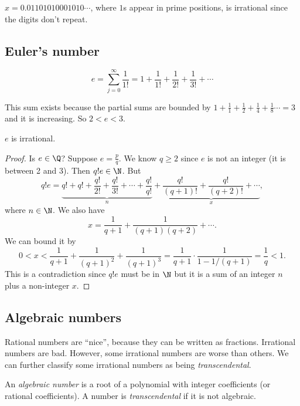 \documentclass[a4paper]{article}
\begin{document}
\begin{eg}
  $x = 0.01101010001010\cdots$, where $1$s appear in prime positions, is irrational since the digits don't repeat.
\end{eg}
\subsection{Euler's number}
\begin{defi}
  \[
    e = \sum_{j=0}^\infty \frac{1}{1!} = 1 + \frac{1}{1!} + \frac{1}{2!} + \frac{1}{3!} + \cdots
  \]
\end{defi}
This sum exists because the partial sums are bounded by $1 + \frac{1}{1} + \frac{1}{2} + \frac{1}{4} + \frac{1}{8}\cdots = 3$ and it is increasing. So $2 < e < 3$.

\begin{prop}
  $e$ is irrational.
\end{prop}

\begin{proof}
  Is $e\in \Q$? Suppose $e = \frac{p}{q}$. We know $q\geq 2$ since $e$ is not an integer (it is between 2 and 3). Then $q!e \in \N$. But
  \[
    q!e = \underbrace{q! + q! + \frac{q!}{2!} + \frac{q!}{3!} + \cdots + \frac{q!}{q!}}_{n} + \underbrace{\frac{q!}{(q + 1)!} + \frac{q!}{(q + 2)!} + \cdots}_{x},
  \]
  where $n \in \N$. We also have
  \[
    x = \frac{1}{q + 1} + \frac{1}{(q + 1)(q + 2)} + \cdots.
  \]
  We can bound it by
  \[
    0 < x < \frac{1}{q+1} +\frac{1}{(q + 1)^2} + \frac{1}{(q + 1)^3} = \frac{1}{q + 1}\cdot \frac{1}{1 - 1/(q + 1)} = \frac{1}{q} < 1.
  \]
  This is a contradiction since $q!e$ must be in $\N$ but it is a sum of an integer $n$ plus a non-integer $x$.
\end{proof}

\subsection{Algebraic numbers}
Rational numbers are ``nice'', because they can be written as fractions. Irrational numbers are bad. However, some irrational numbers are worse than others. We can further classify some irrational numbers as being \emph{transcendental}.
\begin{defi}
  An \emph{algebraic number} is a root of a polynomial with integer coefficients (or rational coefficients). A number is \emph{transcendental} if it is not algebraic.
\end{defi}
\end{document}
